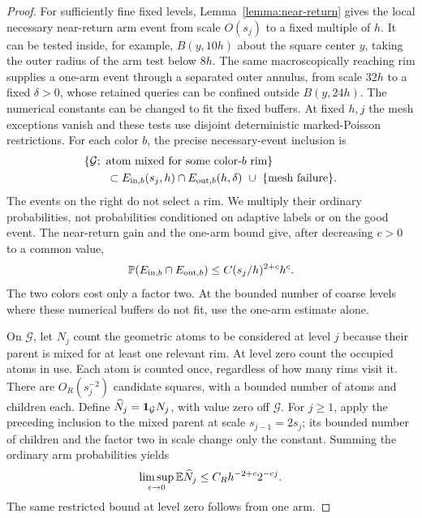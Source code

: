\begin{proof}
For sufficiently fine fixed levels, Lemma~\ref{lemma:near-return}
gives the local necessary near-return arm event from scale $O(s_j)$
to a fixed multiple of $h$.  It can be tested inside, for example,
$B(y,10h)$ about the square center $y$, taking the outer radius of
the arm test below $8h$.  The same macroscopically reaching rim
supplies a one-arm event through a separated outer annulus, from
scale $32h$ to a fixed $\delta>0$, whose retained queries can be
confined outside $B(y,24h)$.  The numerical constants can be changed
to fit the fixed buffers.  At fixed $h,j$ the mesh exceptions vanish
and these tests use disjoint deterministic marked-Poisson
restrictions.  For each color $b$, the precise necessary-event
inclusion is
\[
 \begin{aligned}
 &\{\mathcal G;\ \text{atom mixed for some color-}b\text{ rim}\}
 \\
 &\qquad\subset E_{{\rm in},b}(s_j,h)\cap E_{{\rm out},b}(h,\delta)
                 \ \cup\ \{\text{mesh failure}\}.
 \end{aligned}
\]
The events on the right do not select a rim.  We multiply their
ordinary probabilities, not probabilities conditioned on adaptive
labels or on the good event.  The near-return gain and the one-arm
bound give, after decreasing $c>0$ to a common value,
\[
 \mathbb P(E_{{\rm in},b}\cap E_{{\rm out},b})
                         \le C(s_j/h)^{2+c}h^c.
\]
The two colors cost only a factor two.  At the bounded number of
coarse levels where these numerical buffers do not fit, use the
one-arm estimate alone.

On $\mathcal G$, let $N_j$ count the geometric atoms to be considered at level $j$
because their parent is mixed for at least one relevant rim.  At
level zero count the occupied atoms in use.  Each atom is counted
once, regardless of how many rims visit it.  There are
$O_R(s_j^{-2})$ candidate squares, with a bounded number of atoms
and children each. Define $\widehat N_j=\mathbf 1_{\mathcal G}N_j$,
with value zero off $\mathcal G$. For $j\ge1$, apply the preceding
inclusion to the mixed parent at scale $s_{j-1}=2s_j$; its bounded
number of children and the factor two in scale change only the
constant. Summing the ordinary arm probabilities yields
\begin{equation}\label{actual:mixed-count}
 \limsup_{\varepsilon\to0}\mathbb E\widehat N_j
                 \le C_Rh^{-2+c}2^{-cj}.
\end{equation}
The same restricted bound at level zero follows from one arm.


\end{proof}
